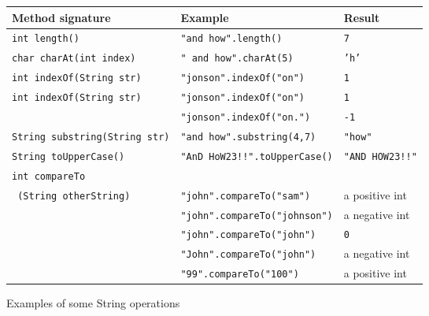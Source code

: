 




\begin {figure}


\begin{tabular} {l l l  }
Method signature &    Example 	& Result   \\
\hline
\texttt{int length()}		&	\texttt{"and how".length()}	& \texttt{7}  		\\
\texttt{char charAt(int index)}	&	\texttt{" and how".charAt(5)}	& \texttt{'h'} 		\\
\texttt{int indexOf(String str)}&	\texttt{"jonson".indexOf("on")}	& \texttt{1}		\\
\texttt{int indexOf(String str)}&	\texttt{"jonson".indexOf("on")}	& \texttt{1}		\\
			&	\texttt{"jonson".indexOf("on.")}	& \texttt{-1}		\\
\texttt{String substring(String str)}
			&	\texttt{"and how".substring(4,7)} & \texttt{"how" }	\\
\texttt{String toUpperCase()}	&  \texttt{"AnD HoW23!!".toUpperCase()}	&  \texttt{"AND HOW23!!"} \\
\texttt{int compareTo}		&					&			\\
\hspace{10pt} 
\texttt{ (String otherString)}			&  \texttt{"john".compareTo("sam")}	& a positive int \\
			&  \texttt{"john".compareTo("johnson")}	& a negative int \\
			&  \texttt{"john".compareTo("john")}	& \texttt{0} 		\\
			&  \texttt{"John".compareTo("john")}	& a negative int \\
			&  \texttt{"99".compareTo("100")}	& a positive int \\


\end {tabular}

\caption {Examples of some String operations}

\label {fig:stringMethods}

\end {figure}


